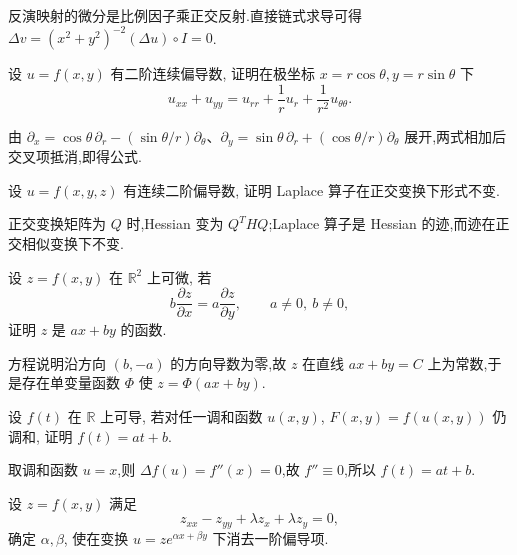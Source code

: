 \begin{solution}
    反演映射的微分是比例因子乘正交反射.直接链式求导可得
    $\Delta v=(x^2+y^2)^{-2}(\Delta u)\circ I=0$.
\end{solution}

\begin{example}
    设 $u=f(x,y)$ 有二阶连续偏导数, 证明在极坐标 $x=r\cos\theta,y=r\sin\theta$ 下
    \[
        u_{xx}+u_{yy}=u_{rr}+\dfrac{1}{r}u_r+\dfrac{1}{r^2}u_{\theta\theta}.
    \]
\end{example}
\exampleblank

\begin{solution}
    由 $\partial_x=\cos\theta\,\partial_r-(\sin\theta/r)\partial_\theta$、$\partial_y=\sin\theta\,\partial_r+(\cos\theta/r)\partial_\theta$ 展开,两式相加后交叉项抵消,即得公式.
\end{solution}

\begin{example}
    设 $u=f(x,y,z)$ 有连续二阶偏导数, 证明 Laplace 算子在正交变换下形式不变.
\end{example}
\exampleblank

\begin{solution}
    正交变换矩阵为 $Q$ 时,Hessian 变为 $Q^THQ$;Laplace 算子是 Hessian 的迹,而迹在正交相似变换下不变.
\end{solution}

\begin{example}
    设 $z=f(x,y)$ 在 $\mathbb{R}^2$ 上可微, 若
    \[
        b\dfrac{\partial z}{\partial x}=a\dfrac{\partial z}{\partial y},
        \qquad a\ne0,\ b\ne0,
    \]
    证明 $z$ 是 $ax+by$ 的函数.
\end{example}
\exampleblank

\begin{solution}
    方程说明沿方向 $(b,-a)$ 的方向导数为零,故 $z$ 在直线 $ax+by=C$ 上为常数,于是存在单变量函数 $\Phi$ 使 $z=\Phi(ax+by)$.
\end{solution}

\begin{example}
    设 $f(t)$ 在 $\mathbb{R}$ 上可导, 若对任一调和函数 $u(x,y)$, $F(x,y)=f(u(x,y))$ 仍调和, 证明 $f(t)=at+b$.
\end{example}
\exampleblank

\begin{solution}
    取调和函数 $u=x$,则 $\Delta f(u)=f''(x)=0$,故 $f''\equiv0$,所以 $f(t)=at+b$.
\end{solution}

\begin{example}
    设 $z=f(x,y)$ 满足
    \[
        z_{xx}-z_{yy}+\lambda z_x+\lambda z_y=0,
    \]
    确定 $\alpha,\beta$, 使在变换 $u=ze^{\alpha x+\beta y}$ 下消去一阶偏导项.
\end{example}
\exampleblank

